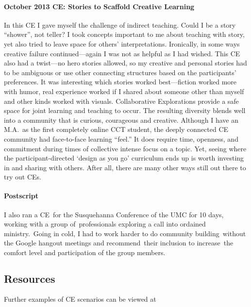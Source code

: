 \paragraph{October 2013 CE: Stories to Scaffold Creative
Learning}\label{october-2013-ce-stories-to-scaffold-creative-learning}

In this CE I gave myself the challenge of indirect teaching. Could I be
a story ``shower'', not teller? I took concepts important to me about
teaching with story, yet also tried to leave space for others'
interpretations. Ironically, in some ways creative failure
continued---again I was not as helpful as I had wished. This CE also had
a twist---no hero stories allowed, so my creative and personal stories
had to be ambiguous or use other connecting structures based on the
participants' preferences. It was interesting which stories worked
best---fiction worked more with humor, real experience worked if I
shared about someone other than myself and other kinds worked with
visuals. Collaborative Explorations provide a safe space for joint
learning and teaching to occur. The resulting diversity blends well into
a community that is curious, courageous and creative. Although I have an
M.A.~as the first completely online CCT student, the deeply connected CE
community had face-to-face learning ``feel.'' It does require time,
openness, and commitment during times of collective intense focus on a
topic. Yet, seeing where the participant-directed `design as you go'
curriculum ends up is worth investing in and sharing with others. After
all, there are many other ways still out there to try out CEs.

\paragraph{Postscript}\label{postscript}

I also ran a CE~for the Susquehanna Conference of the UMC for 10 days,
working with a group of~professionals exploring a call into ordained
ministry.~Going in cold, I had to work harder to do community
building~without the Google hangout meetings and recommend~their
inclusion to increase~the comfort level and participation of the group
members.

\subsection{Resources}\label{resources}

Further examples of CE scenarios can be viewed at

